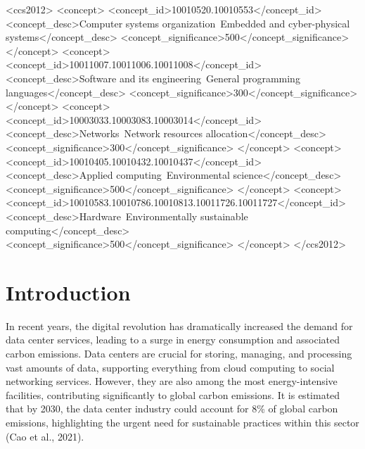 \documentclass[acmlarge]{acmart}
\begin{document}
\begin{CCSXML}
	<ccs2012>
	<concept>
	<concept_id>10010520.10010553</concept_id>
	<concept_desc>Computer systems organization~Embedded and cyber-physical systems</concept_desc>
	<concept_significance>500</concept_significance>
	</concept>
	<concept>
	<concept_id>10011007.10011006.10011008</concept_id>
	<concept_desc>Software and its engineering~General programming languages</concept_desc>
	<concept_significance>300</concept_significance>
	</concept>
	<concept>
	<concept_id>10003033.10003083.10003014</concept_id>
	<concept_desc>Networks~Network resources allocation</concept_desc>
	<concept_significance>300</concept_significance>
	</concept>
	<concept>
	<concept_id>10010405.10010432.10010437</concept_id>
	<concept_desc>Applied computing~Environmental science</concept_desc>
	<concept_significance>500</concept_significance>
	</concept>
	<concept>
	<concept_id>10010583.10010786.10010813.10011726.10011727</concept_id>
	<concept_desc>Hardware~Environmentally sustainable computing</concept_desc>
	<concept_significance>500</concept_significance>
	</concept>
	</ccs2012>
\end{CCSXML}


	
	
	
	\maketitle
	
	\section{Introduction}
	In recent years, the digital revolution has dramatically increased the demand for data center services, leading to a surge in energy consumption and associated carbon emissions. Data centers are crucial for storing, managing, and processing vast amounts of data, supporting everything from cloud computing to social networking services. However, they are also among the most energy-intensive facilities, contributing significantly to global carbon emissions. It is estimated that by 2030, the data center industry could account for 8\% of global carbon emissions, highlighting the urgent need for sustainable practices within this sector (Cao et al., 2021).
	
\end{document}
